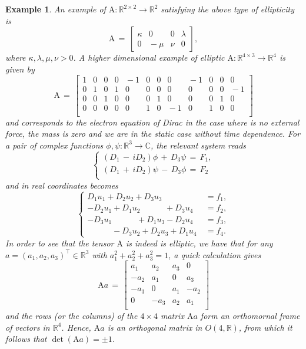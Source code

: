 \documentclass{amsart}
\newtheorem{example}[theorem]{Example}
\theoremstyle{definition}
\numberwithin{equation}{section}
\begin{document}
\begin{example}
An example of ${\textrm{A}} : {\mathbb{R}}^{2 {\times} 2} {\longrightarrow} {\mathbb{R}}^2$ satisfying the above type of ellipticity is
\[
{\textrm{A}} \, =\, 
\left[
\begin{array}{cc|cc}
{\kappa} & 0 & 0 & {\lambda}\\
0 & \!\!\!-\mu & \nu & 0 
\end{array}
\right],
\]
where ${\kappa},{\lambda},\mu, \nu>0$. A higher dimensional example of elliptic ${\textrm{A}} : {\mathbb{R}}^{4{\times} 3}{\longrightarrow} {\mathbb{R}}^4$ is given by
\[
{\textrm{A}} \, =\, 
\left[
\begin{array}{rrr|rrr|rrr|rrr}
1 & 0 & 0    &      0 & \!\!\!-1 & 0    &    0 & 0 & \!\!\!-1   & 0& 0 & 0  \\
0 & 1 & 0    &      1 & 0 & 0    &     0 & 0 & 0   &  0& 0 & \!\!\!-1  \\
0 & 0 & 1    &      0 & 0 & 0    &    1 & 0 & 0   &   0& 1 & 0  \\
0 & 0 & 0    &      0 & 0 & 1    &    0 & \!\!\!-1 &0   &   1& 0 & 0  \\
\end{array}
\right]
\]
and corresponds to the electron equation of Dirac in the case where is no external force, the mass is zero and we are in the static case without time dependence. For a pair of complex functions $\phi,\psi : {\mathbb{R}}^3 {\longrightarrow} \mathbb{C}$, the relevant system reads
\[
\left\{
\begin{split}
(D_1\, -\, i D_2)\phi\, +\, D_3\psi\, =\, F_1,\\
(D_1\, +\, i D_2)\psi\, -\, D_3\phi\, =\, F_2\\
\end{split}
\right.
\]
and in real coordinates becomes
\[
\left\{
\begin{split}
D_1u_1 + D_2u_2+D_3u_3 \phantom{+D_3u_3} & \ =f_1,\\
-D_2u_1 +D_1u_2 \phantom{+D_3u_3}+D_3u_4&\ =f_2,\\
-D_3u_1 \phantom{+D_3u_3}+D_1u_3-D_2u_4 &\ =f_3,\\
 \phantom{+D_3u_3}-D_3u_2+D_2u_3+D_1u_4&\ =f_4.
\end{split}
\right.
\]
In order to see that the tensor ${\textrm{A}}$ is indeed is elliptic, we have that for any $a=(a_1,a_2,a_3)^\top\in {\mathbb{R}}^3$ with $a_1^2+a_2^2+a_3^2=1$, a quick calculation gives
\[
{\textrm{A}} a \, =\, 
\left[
\begin{array}{rrrr}
a_1 & a_2 & a_3  &  0 \\
-a_2 & a_1 & 0  & a_3 \\
-a_3 & 0 & a_1  & -a_2 \\
0 & -a_3 & a_2  & a_1 \\
\end{array}
\right]
\]
and the rows (or the columns) of the $4{\times}4$ matrix ${\textrm{A}} a$ form an orthomornal frame of vectors in ${\mathbb{R}}^4$. Hence, ${\textrm{A}} a $ is an orthogonal matrix in $O(4,{\mathbb{R}})$, from which it follows that $\det({\textrm{A}} a)=\pm 1$. 
\end{example}
\end{document}
